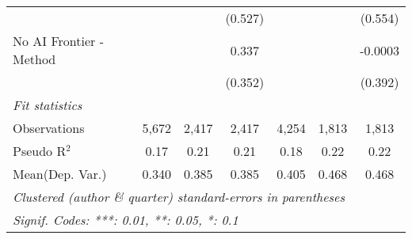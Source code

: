 \begin{tabular}{lcccccc}
                           &               &              & (0.527)      &               &               & (0.554)\\   
   No AI Frontier - Method &               &              & 0.337        &               &               & -0.0003\\   
                           &               &              & (0.352)      &               &               & (0.392)\\   
   \midrule
   \emph{Fit statistics}\\
   Observations            & 5,672         & 2,417        & 2,417        & 4,254         & 1,813         & 1,813\\  
   Pseudo R$^2$            & 0.17          & 0.21         & 0.21         & 0.18          & 0.22          & 0.22\\  
Mean(Dep. Var.) & 0.340 & 0.385 & 0.385 & 0.405 & 0.468 & 0.468 \\
   \midrule \midrule
   \multicolumn{7}{l}{\emph{Clustered (author \& quarter) standard-errors in parentheses}}\\
   \multicolumn{7}{l}{\emph{Signif. Codes: ***: 0.01, **: 0.05, *: 0.1}}\\
\end{tabular}
\par\endgroup

